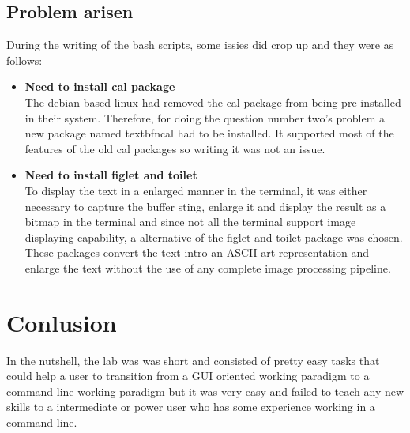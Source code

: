 \documentclass{article}
\begin{document}
\subsection{Problem arisen}
During the writing of the bash scripts, some issies did crop up and they were as follows:
\begin{itemize}
    \item \textbf{Need to install cal package}\\
    The debian based linux had removed the cal package from being pre installed in their system. Therefore, for doing the question number two's problem a new package named textbf{ncal} had to be installed. It supported most of the features of the old cal packages so writing it was not an issue.
    \item \textbf{Need to install figlet and toilet}\\
    To display the text in a enlarged manner in the terminal, it was either necessary to capture the buffer sting, enlarge it and display the result as a bitmap in the terminal and since not all the terminal support image displaying capability, a alternative of the figlet and toilet package was chosen. These packages convert the text intro an ASCII art representation and enlarge the text without the use of any complete image processing pipeline. 
    
\end{itemize}

\section{Conlusion}
In the nutshell, the lab was was short and consisted of pretty easy tasks that could help a user to transition from a GUI oriented working paradigm to a command line working paradigm but it was very easy and failed to teach any new skills to a intermediate or power user who has some experience working in a command line.
\end{document}
